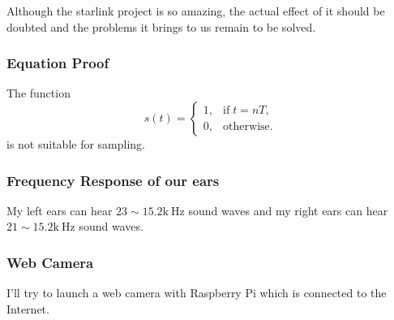 \documentclass{article}
\begin{document}
Although the starlink project is so amazing, the actual effect of it should be doubted and the problems it brings to us remain to be solved.
\subsubsection*{Equation Proof}

The function 
$$
s(t) = 
\left\{
    \begin{array}{lr}
        1, & \mathrm{if}\; t = nT,\\
        0, & \mathrm{otherwise.}
    \end{array}
\right.
$$
is not suitable for sampling.
\subsubsection*{Frequency Response of our ears}

My left ears can hear $23 \sim 15.2 \mathrm{k~Hz}$ sound waves and my right ears can hear $21 \sim 15.2  \mathrm{k~Hz}$ sound waves.
\subsubsection*{Web Camera}

I'll try to launch a web camera with Raspberry Pi which is connected to the Internet.


\end{document}
